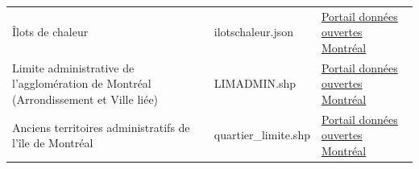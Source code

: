 \documentclass[]{book}
\theoremstyle{definition}
\theoremstyle{definition}
\theoremstyle{definition}
\theoremstyle{remark}
\begin{document}
\begin{longtable}[]{@{}lll@{}}
\begin{minipage}[t]{0.08\columnwidth}\raggedright\strut
Îlots de chaleur\strut
\end{minipage} & \begin{minipage}[t]{0.16\columnwidth}\raggedright\strut
ilotschaleur.json\strut
\end{minipage} & \begin{minipage}[t]{0.10\columnwidth}\raggedright\strut
\href{http://donnees.ville.montreal.qc.ca/dataset/schema-environnement-milieux-naturels/resource/8cd8d34a-cfdd-4acf-a363-d4adaeff18c0}{Portail
données ouvertes Montréal}\strut
\end{minipage}\tabularnewline
\begin{minipage}[t]{0.08\columnwidth}\raggedright\strut
Limite administrative de l'agglomération de Montréal (Arrondissement et
Ville liée)\strut
\end{minipage} & \begin{minipage}[t]{0.16\columnwidth}\raggedright\strut
LIMADMIN.shp\strut
\end{minipage} & \begin{minipage}[t]{0.10\columnwidth}\raggedright\strut
\href{http://donnees.ville.montreal.qc.ca/dataset/polygones-arrondissements}{Portail
données ouvertes Montréal}\strut
\end{minipage}\tabularnewline
\begin{minipage}[t]{0.08\columnwidth}\raggedright\strut
Anciens territoires administratifs de l'île de Montréal\strut
\end{minipage} & \begin{minipage}[t]{0.16\columnwidth}\raggedright\strut
quartier\_limite.shp\strut
\end{minipage} & \begin{minipage}[t]{0.10\columnwidth}\raggedright\strut
\href{http://donnees.ville.montreal.qc.ca/dataset/anciens-territoires}{Portail
données ouvertes Montréal}\strut
\end{minipage}\tabularnewline
\bottomrule
\end{longtable}


\end{document}
